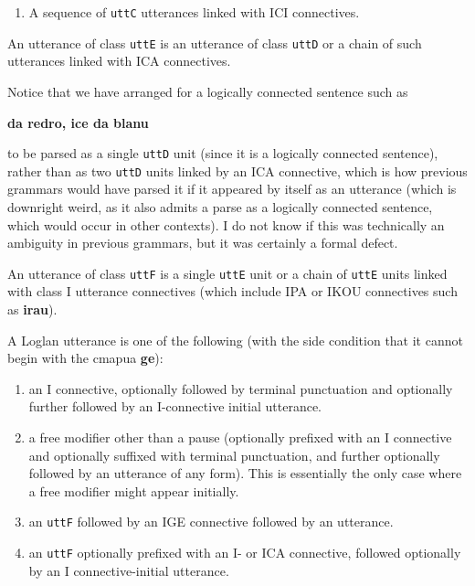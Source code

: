 \documentclass[12pt]{book}
\begin{document}
{\begin{enumerate}
\item  A sequence of {\tt uttC} utterances linked with ICI connectives.

\end{enumerate}

An utterance of class {\tt uttE} is an utterance of class {\tt uttD} or a chain of such utterances linked with ICA connectives.

Notice that we have arranged for a logically connected sentence such as

{\bf da redro, ice da blanu}

to be parsed as a single {\tt uttD} unit (since it is a logically connected sentence), rather than as two {\tt uttD} units linked by an ICA connective, which is how previous grammars would have parsed it if it appeared by itself as an utterance (which is downright weird, as it also admits a parse as a logically connected sentence, which would occur in other contexts).  I do not know if this was technically an ambiguity in previous grammars, but it was certainly a formal defect.

An utterance of class {\tt uttF} is a single {\tt uttE} unit or a chain of {\tt uttE} units linked with class I utterance connectives (which include IPA or IKOU connectives such as {\bf irau}).

A Loglan utterance is one of the following (with the side condition that it cannot begin with the cmapua {\bf ge}):

\begin{enumerate}

\item  an I connective, optionally followed by terminal punctuation and optionally further followed by an I-connective initial utterance.

\item  a free modifier other than a pause (optionally prefixed with an I connective and optionally suffixed with terminal punctuation, and further optionally followed by an utterance of any form).   This is essentially the only case where a free modifier might appear initially.

\item  an {\tt uttF} followed by an IGE connective followed by an utterance.

\item  an {\tt uttF} optionally prefixed with an I- or ICA connective, followed optionally by an I connective-initial utterance.

\end{enumerate}

}
\end{document}
